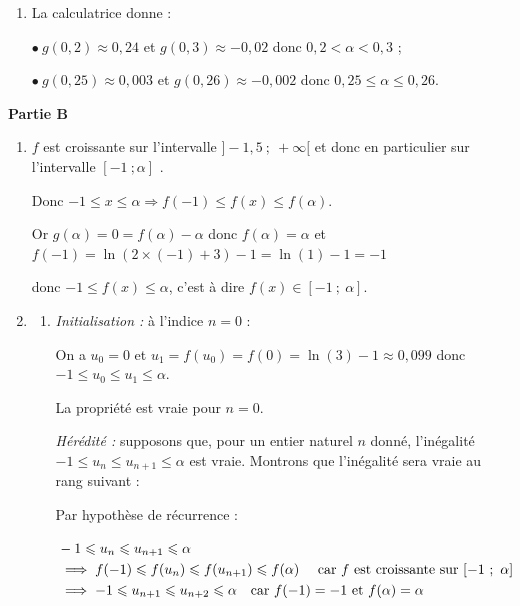 \begin{enumerate}
\begin{enumerate}
En vertu du corollaire au théorème des valeurs intermédiaires appliqué aux fonctions strictement monotones, l'équation $g(x)=0$ admet une unique solution sur l'intervalle $]-0,5~;~+\infty[$.
	\item La calculatrice donne :
	
$\bullet~$$g(0,2) \approx 0,24$ et $g(0,3) \approx - 0,02$ donc $0,2 < \alpha < 0,3$ ;
	
$\bullet~$$g(0,25) \approx 0,003$ et $g(0,26) \approx - 0,002$ donc $0,25\leqslant\alpha \leqslant 0,26$.
	\end{enumerate}
\end{enumerate}

\bigskip

\textbf{Partie B}

\medskip

\begin{enumerate}
\item $f$ est  croissante sur l'intervalle  $ ]-1,5~;~+\infty[ $  et donc en particulier sur l'intervalle $[-1~; \alpha]$ .

Donc $-1 \leqslant x \leqslant \alpha \Longrightarrow f(-1) \leqslant f(x) \leqslant f(\alpha)$.

Or $g(\alpha ) = 0 = f(\alpha) -\alpha$ donc $ f(\alpha)=\alpha$ et $f(-1) = \ln(2\times(-1)+3)-1= \ln(1) - 1 =- 1$

donc $- 1 \leqslant f(x) \leqslant\alpha $, c'est à dire $f(x) \in [-1~;~\alpha]$.
\item
	\begin{enumerate}
		\item
\emph{Initialisation :} à l'indice $n=0$ :
			
On a  $u_0=0$ et $u_1=f(u_0)=f(0)=\ln(3)-1\approx 0,099$  donc $-1 \leqslant u_0 \leqslant u_1 \leqslant\alpha$.

La propriété est vraie pour $n=0$.

\emph{Hérédité :} supposons que, pour un entier naturel $n$ donné, l'inégalité  $-1 \leqslant u_n \leqslant u_{n+1} \leqslant\alpha$ est vraie. Montrons que l'inégalité sera vraie au rang suivant :

Par hypothèse de récurrence : 

$\aligned[t]  & -1 \leqslant u_n \leqslant u_{n+1} \leqslant\alpha \\
	&\implies f(-1) \leqslant f(u_n) \leqslant f(u_{n+1}) \leqslant f(\alpha) \quad \text{ car } f \text{ est croissante sur  } [-1~;~\alpha]\\
	&\implies -1\leqslant u_{n+1}\leqslant u_{n+2} \leqslant\alpha  \quad \text{car } f(-1)=-1 \text{ et } f(\alpha)=\alpha\\ \endaligned$


\end{enumerate}
\end{enumerate}
